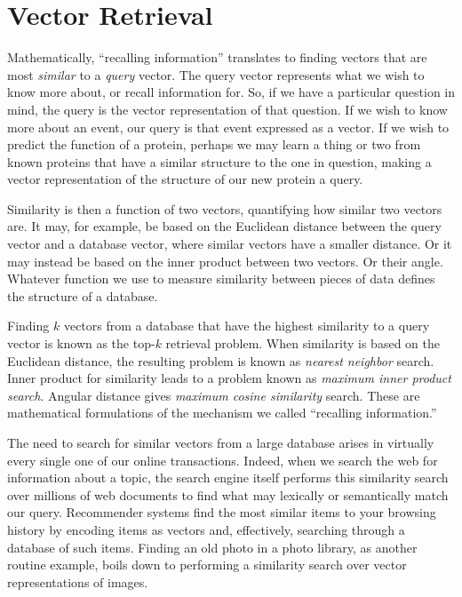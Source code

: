 \section*{Vector Retrieval}

Mathematically, ``recalling information'' translates to finding vectors that are
most \emph{similar} to a \emph{query} vector. The query vector represents what
we wish to know more about, or recall information for. So, if we have a
particular question in mind, the query is the vector representation of that question.
If we wish to know more about an event, our query is that event expressed as a vector.
If we wish to predict the function of a protein, perhaps we may learn a thing or two
from known proteins that have a similar structure to the one in question,
making a vector representation of the structure of our new protein a query.

Similarity is then a function of two vectors, quantifying how similar two vectors are.
It may, for example, be based on the Euclidean distance
between the query vector and a database vector, where similar vectors have a smaller
distance. Or it may instead be based on the inner product between two vectors.
Or their angle. Whatever function we use to measure similarity between pieces
of data defines the structure of a database.

Finding $k$ vectors from a database that have the highest similarity to a query vector
is known as the top-$k$ retrieval problem.
When similarity is based on the Euclidean distance, 
the resulting problem is known as \emph{nearest neighbor} search.
Inner product for similarity leads to a problem known as \emph{maximum inner product search}.
Angular distance gives \emph{maximum cosine similarity} search.
These are mathematical formulations of the mechanism we called ``recalling information.''

\bigskip

The need to search for similar vectors from a large database
arises in virtually every single one of our online transactions.
Indeed, when we search the web for information about a topic, the search engine itself
performs this similarity search over millions of web documents to find what may
lexically or semantically match our query. Recommender systems find the most similar
items to your browsing history by encoding items as vectors and, effectively, searching
through a database of such items. Finding an old photo in a photo library,
as another routine example, boils down to performing a similarity search over vector
representations of images.

